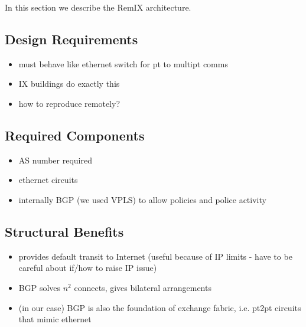 In this section we describe the RemIX architecture.

\subsection{Design Requirements}

\begin{itemize}
    \item must behave like ethernet switch for pt to multipt comms 
    \item IX buildings do exactly this
    \item how to reproduce remotely?
\end{itemize}


\subsection{Required Components}
\begin{itemize}
    \item AS number required
    \item ethernet circuits
    \item internally BGP (we used VPLS) to allow policies and police activity
\end{itemize}


\subsection{Structural Benefits}
\begin{itemize}
    \item provides default transit to Internet (useful because of IP limits - have to be careful about if/how to raise IP issue)
    \item BGP solves $n^2$ connects, gives bilateral arrangements
    \item (in our case) BGP is also the foundation of exchange fabric, i.e. pt2pt circuits that mimic ethernet
\end{itemize}
